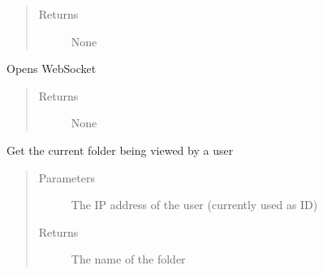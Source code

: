 \documentclass[letterpaper,10pt,english]{sphinxmanual}
\begin{document}
\begin{fulllineitems}
\begin{fulllineitems}
\begin{quote}
\begin{description}
\item[{Returns}] \leavevmode
None

\end{description}\end{quote}

\end{fulllineitems}


\begin{fulllineitems}
\label{\detokenize{funcs:backend.SocketHandler.open}}
Opens WebSocket
\begin{quote}\begin{description}
\item[{Returns}] \leavevmode
None

\end{description}\end{quote}

\end{fulllineitems}


\end{fulllineitems}


\begin{fulllineitems}
\label{\detokenize{funcs:backend.current}}
Get the current folder being viewed by a user
\begin{quote}\begin{description}
\item[{Parameters}] \leavevmode
{} \textendash{} The IP address of the user (currently used as ID)

\item[{Returns}] \leavevmode
The name of the folder

\end{description}\end{quote}

\end{fulllineitems}

\end{document}

